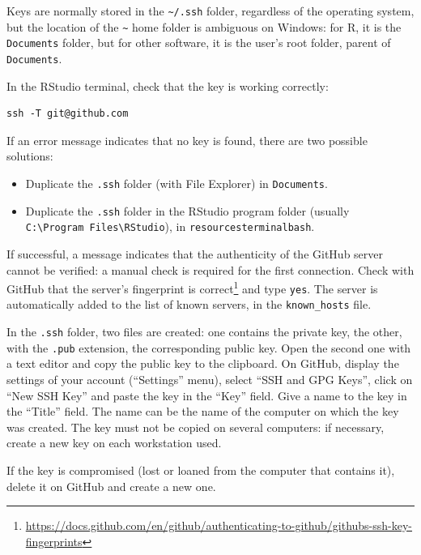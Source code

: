 \documentclass[
  12pt,
  american,
  a4paper,
  extrafontsizes,onecolumn,openright
  ]{memoir}
\providecommand{\tightlist}{%
  \setlength{\itemsep}{0pt}\setlength{\parskip}{0pt}}
\begin{document}
Keys are normally stored in the \texttt{\textasciitilde{}/.ssh} folder, regardless of the operating system, but the location of the \texttt{\textasciitilde{}} home folder is ambiguous on Windows: for R, it is the \texttt{Documents} folder, but for other software, it is the user's root folder, parent of \texttt{Documents}.

In the RStudio terminal, check that the key is working correctly:

\begin{verbatim}
ssh -T git@github.com
\end{verbatim}

If an error message indicates that no key is found, there are two possible solutions:

\begin{itemize}
\tightlist
\item
  Duplicate the \texttt{.ssh} folder (with File Explorer) in \texttt{Documents}.
\item
  Duplicate the \texttt{.ssh} folder in the RStudio program folder (usually \texttt{C:\textbackslash{}Program\ Files\textbackslash{}RStudio}), in \texttt{resourcesterminalbash}.
\end{itemize}

If successful, a message indicates that the authenticity of the GitHub server cannot be verified: a manual check is required for the first connection.
Check with GitHub that the server's fingerprint is correct\footnote{\url{https://docs.github.com/en/github/authenticating-to-github/githubs-ssh-key-fingerprints}} and type \texttt{yes}.
The server is automatically added to the list of known servers, in the \texttt{known\_hosts} file.

In the \texttt{.ssh} folder, two files are created: one contains the private key, the other, with the \texttt{.pub} extension, the corresponding public key.
Open the second one with a text editor and copy the public key to the clipboard.
On GitHub, display the settings of your account (\enquote{Settings} menu), select \enquote{SSH and GPG Keys}, click on \enquote{New SSH Key} and paste the key in the \enquote{Key} field.
Give a name to the key in the \enquote{Title} field.
The name can be the name of the computer on which the key was created.
The key must not be copied on several computers: if necessary, create a new key on each workstation used.

If the key is compromised (lost or loaned from the computer that contains it), delete it on GitHub and create a new one.
\end{document}
